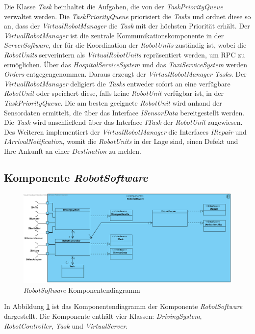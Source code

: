 Die Klasse \textit{Task} beinhaltet die Aufgaben, die von der \textit{TaskPriorityQueue} verwaltet werden. 
Die \textit{TaskPriorityQueue} priorisiert die \textit{Tasks} und ordnet diese so an, dass der \textit{VirtualRobotManager} die \textit{Task} mit der höchsten Priorität erhält. 
Der \textit{VirtualRobotManager} ist die zentrale Kommunikationskomponente in der \textit{ServerSoftware}, der für die Koordination der \textit{RobotUnits} zuständig ist, wobei die \textit{RobotUnits} serverintern als \textit{VirtualRobotUnits} repräsentiert werden, um RPC zu ermöglichen. Über das \textit{HospitalServiceSystem} und das \textit{TaxiServiceSystem} werden \textit{Orders} entgegengenommen. Daraus erzeugt der \textit{VirtualRobotManager} \textit{Tasks}. Der \textit{VirtualRobotManager} deligiert die \textit{Tasks} entweder sofort an eine verfügbare \textit{RobotUnit} oder speichert diese, falls keine \textit{RobotUnit} verfügbar ist, in der \textit{TaskPriorityQueue}. Die am besten geeignete \textit{RobotUnit} wird anhand der Sensordaten ermittelt, die über das Interface \textit{ISensorData} bereitgestellt werden. Die \textit{Task} wird anschließend über das Interface \textit{ITask} der \textit{RobotUnit} zugewiesen. Des Weiteren implementiert der \textit{VirtualRobotManager} die Interfaces \textit{IRepair} und \textit{IArrivalNotification}, womit die \textit{RobotUnits} in der Lage sind, einen Defekt und Ihre Ankunft an einer \textit{Destination} zu melden.
\subsection{Komponente \textit{RobotSoftware}}
\begin{figure}[H]
\centering
\includegraphics[width=1\textwidth]{img/2-Entwurf-5-RobotSoftware}
\caption{\emph{RobotSoftware}-Komponentendiagramm}
\label{KomponentenStruktur2}
\end{figure}
In Abbildung \ref{KomponentenStruktur2} ist das Komponentendiagramm der Komponente \textit{RobotSoftware} dargestellt. 
Die Komponente enthält vier Klassen: \textit{DrivingSystem}, \textit{RobotController}, \textit{Task} und \textit{VirtualServer}.

